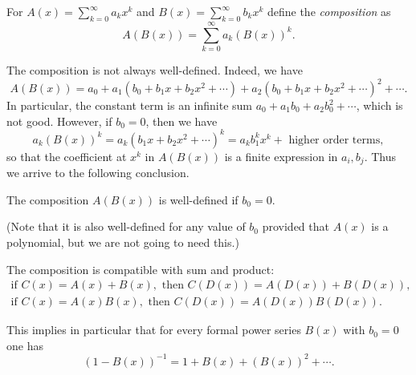 \begin{page}

\begin{dfn}
For $A(x) = \sum_{k=0}^\infty a_k x^k$ and $B(x) = \sum_{k=0}^\infty b_k x^k$ define the \emph{composition} as
\[
A(B(x)) = \sum_{k=0}^\infty a_k (B(x))^k.
\]
\end{dfn}

\end{page}

\begin{page}

The composition is not always well-defined. Indeed, we have
\[
A(B(x)) = a_0 + a_1(b_0 + b_1 x + b_2 x^2 + \cdots) + a_2(b_0 + b_1 x + b_2 x^2 + \cdots)^2 + \cdots.
\]
In particular, the constant term is an infinite sum $a_0 + a_1 b_0 + a_2 b_0^2 + \cdots$, which is not good.
However, if $b_0 = 0$, then we have
\[
a_k (B(x))^k = a_k (b_1 x + b_2 x^2 + \cdots)^k = a_k b_1^k x^k + \text{ higher order terms},
\]
so that the coefficient at $x^k$ in $A(B(x))$ is a finite expression in $a_i, b_j$.
Thus we arrive to the following conclusion.


\end{page}

\begin{page}

\begin{lem}
The composition $A(B(x))$ is well-defined if $b_0 = 0$.
\end{lem}

\end{page}

\begin{page}

(Note that it is also well-defined for any value of $b_0$ provided that $A(x)$ is a polynomial, but we are not going to need this.)

The composition is compatible with sum and product:
\begin{gather*}
\text{if } C(x) = A(x) + B(x), \text{ then } C(D(x)) = A(D(x)) + B(D(x)),\\
\text{if } C(x) = A(x)B(x), \text{ then } C(D(x)) = A(D(x))B(D(x)).
\end{gather*}

This implies in particular that for every formal power series $B(x)$ with $b_0 = 0$ one has
\[
(1 - B(x))^{-1} = 1 + B(x) + (B(x))^2 + \cdots.
\]


\end{page}

